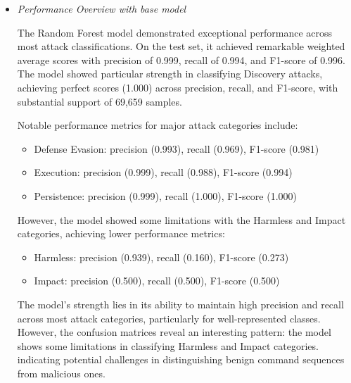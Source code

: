             \begin{itemize}
        
                \item \textit{Performance Overview with base model}
                
                    \vspace{0.3em}

                    The Random Forest model demonstrated exceptional performance across most attack classifications. On the test set, it achieved remarkable weighted average scores with precision of 0.999, recall of 0.994, and F1-score of 0.996. The model showed particular strength in classifying Discovery attacks, achieving perfect scores (1.000) across precision, recall, and F1-score, with substantial support of 69,659 samples.
            
            
                    Notable performance metrics for major attack categories include:
                    \begin{itemize}
                        \item Defense Evasion: precision (0.993), recall (0.969), F1-score (0.981)
                        \item Execution: precision (0.999), recall (0.988), F1-score (0.994)
                        \item Persistence: precision (0.999), recall (1.000), F1-score (1.000)
                    \end{itemize}

                    However, the model showed some limitations with the Harmless and Impact categories, achieving lower performance metrics:
                    \begin{itemize}
                        \item Harmless: precision (0.939), recall (0.160), F1-score (0.273)
                        \item Impact: precision (0.500), recall (0.500), F1-score (0.500)
                    \end{itemize}
            
                    The model's strength lies in its ability to maintain high precision and recall across most attack categories, particularly for well-represented classes. However, the confusion matrices reveal an interesting pattern: the model shows some limitations in classifying Harmless and Impact categories. indicating potential challenges in distinguishing benign command sequences from malicious ones.


\end{itemize}
